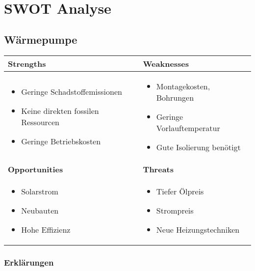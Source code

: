\chapter{SWOT Analyse}
\label{chap:swot}

\section{Wärmepumpe}

\begin{tabular}[c]{|p{}|p{}|}
  \hline
  \textbf{Strengths} &
  \textbf{Weaknesses} \\ \hline
  
  \begin{itemize}
    \item Geringe Schadstoffemissionen
    \item Keine direkten fossilen Ressourcen
    \item Geringe Betriebskosten
  \end{itemize}
  &
  
  \begin{itemize}
    \item Montagekosten, Bohrungen
    \item Geringe Vorlauftemperatur
    \item Gute Isolierung benötigt
  \end{itemize}
  \\ \hline
  
  \textbf{Opportunities} &
  \textbf{Threats} \\ \hline
  
  \begin{itemize}
    \item Solarstrom
    \item Neubauten
    \item Hohe Effizienz
  \end{itemize}
  &
  
  \begin{itemize}
    \item Tiefer Ölpreis
    \item Strompreis
    \item Neue Heizungstechniken
  \end{itemize}  
  \\ \hline
\end{tabular}

\subsection{Erklärungen}

